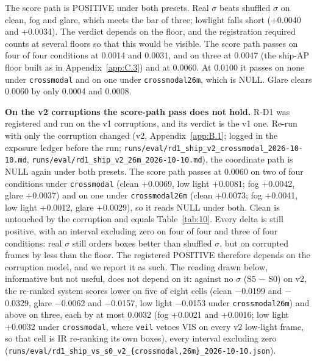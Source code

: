 \documentclass[journal,onecolumn]{IEEEtran}
\begin{document}
The score path is POSITIVE under both presets. Real $\sigma$ beats shuffled $\sigma$ on clean, fog and glare, which meets the bar of three; lowlight falls short (+0.0040 and +0.0034). The verdict depends on the floor, and the registration required counts at several floors so that this would be visible. The score path passes on four of four conditions at 0.0014 and 0.0031, and on three at 0.0047 (the ship-AP floor built as in Appendix~\ref{app:C.3}) and at 0.0060. At 0.0100 it passes on none under \texttt{crossmodal} and on one under \texttt{crossmodal26m}, which is NULL. Glare clears 0.0060 by only 0.0004 and 0.0008.

\textbf{On the v2 corruptions the score-path pass does not hold.} R-D1 was registered and run on the v1 corruptions, and its verdict is the v1 one. Re-run with only the corruption changed (v2, Appendix~\ref{app:B.1}; logged in the exposure ledger before the run; \texttt{runs/\allowbreak{}eval/\allowbreak{}rd1\_\allowbreak{}ship\_\allowbreak{}v2\_\allowbreak{}crossmodal\_\allowbreak{}2026-\allowbreak{}10-\allowbreak{}10.md}, \texttt{runs/\allowbreak{}eval/\allowbreak{}rd1\_\allowbreak{}ship\_\allowbreak{}v2\_\allowbreak{}26m\_\allowbreak{}2026-\allowbreak{}10-\allowbreak{}10.md}), the coordinate path is NULL again under both presets. The score path passes at 0.0060 on two of four conditions under \texttt{crossmodal} (clean +0.0069, low light +0.0081; fog +0.0042, glare +0.0037) and on one under \texttt{crossmodal26m} (clean +0.0073; fog +0.0041, low light +0.0012, glare +0.0029), so it reads NULL under both. Clean is untouched by the corruption and equals Table~\ref{tab:10}. Every delta is still positive, with an interval excluding zero on four of four and three of four conditions: real $\sigma$ still orders boxes better than shuffled $\sigma$, but on corrupted frames by less than the floor. The registered POSITIVE therefore depends on the corruption model, and we report it as such. The reading drawn below, informative but not useful, does not depend on it: against no $\sigma$ (S5 $-$ S0) on v2, the re-ranked system scores lower on five of eight cells (clean $-$0.0199 and $-$0.0329, glare $-$0.0062 and $-$0.0157, low light $-$0.0153 under \texttt{crossmodal26m}) and above on three, each by at most 0.0032 (fog +0.0021 and +0.0016; low light +0.0032 under \texttt{crossmodal}, where \texttt{veil} vetoes VIS on every v2 low-light frame, so that cell is IR re-ranking its own boxes), every interval excluding zero (\texttt{runs/\allowbreak{}eval/\allowbreak{}rd1\_\allowbreak{}ship\_\allowbreak{}vs\_\allowbreak{}s0\_\allowbreak{}v2\_\allowbreak{}\{crossmodal,26m\}\_\allowbreak{}2026-\allowbreak{}10-\allowbreak{}10.json}).
\end{document}
